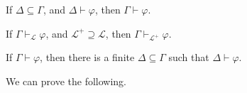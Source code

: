 \begin{remark}
	If \(\Delta \subseteq \Gamma \), and \(\Delta \vdash \varphi \), then \(\Gamma \vdash \varphi \).
\end{remark}

\begin{remark}
	If \(\Gamma \vdash _{\mathcal{L} } \varphi \), and \(\mathcal{L} ^+ \supseteq \mathcal{L}  \), then \(\Gamma \vdash _{\mathcal{L} ^+} \varphi \).
\end{remark}

\begin{remark}
	If \(\Gamma \vdash \varphi \), then there is a finite \(\Delta \subseteq \Gamma \) such that \(\Delta \vdash \varphi \).
\end{remark}

We can prove the following.

